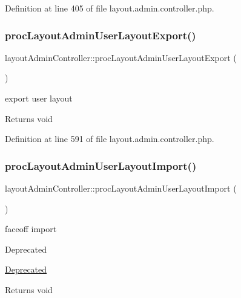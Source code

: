 Definition at line 405 of file layout.\+admin.\+controller.\+php.

\mbox{\label{classlayoutAdminController_a51cfe704e67bb01f9f3e471f097e5684}} 
\subsubsection{\texorpdfstring{proc\+Layout\+Admin\+User\+Layout\+Export()}{procLayoutAdminUserLayoutExport()}}
{\footnotesize\ttfamily layout\+Admin\+Controller\+::proc\+Layout\+Admin\+User\+Layout\+Export (\begin{DoxyParamCaption}{ }\end{DoxyParamCaption})}

export user layout \begin{DoxyReturn}{Returns}
void 
\end{DoxyReturn}


Definition at line 591 of file layout.\+admin.\+controller.\+php.

\mbox{\label{classlayoutAdminController_a82cf560f92d64e4d76e90c969ebcda70}} 
\subsubsection{\texorpdfstring{proc\+Layout\+Admin\+User\+Layout\+Import()}{procLayoutAdminUserLayoutImport()}}
{\footnotesize\ttfamily layout\+Admin\+Controller\+::proc\+Layout\+Admin\+User\+Layout\+Import (\begin{DoxyParamCaption}{ }\end{DoxyParamCaption})}

faceoff import \begin{DoxyRefDesc}{Deprecated}
\item[\hyperlink{deprecated__deprecated000017}{Deprecated}]\end{DoxyRefDesc}
\begin{DoxyReturn}{Returns}
void 
\end{DoxyReturn}


